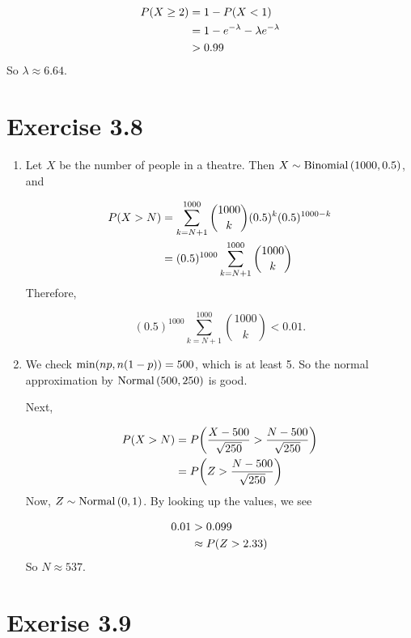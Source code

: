 \documentclass[12pt,letterpaper,reqno]{amsart}
\numberwithin{equation}{subsection}
\begin{document}
\begin{align*}
    {P}\! \left( {X \geq 2} \right) &= 1 - {P}\! \left( {X < 1} \right) \\
                      &= 1 - e^{-\lambda} - \lambda e^{-\lambda} \\
                      &> 0.99
\end{align*}
So $\lambda \approx 6.64$.

\newpage
\section{Exercise 3.8}

\begin{enumerate}[label=(\alph*),leftmargin=*]
    \item Let $X$ be the number of people in a theatre. Then $X \sim \operatorname{Binomial}\left( {1000, 0.5}\right)$, and
    
    \begin{align*}
        {P}\! \left( {X > N} \right) &= \sum_{k=N+1}^{1000} \binom{1000}{k} (0.5)^k (0.5)^{1000-k} \\
        &= (0.5)^{1000} \sum_{k=N+1}^{1000} \binom{1000}{k}
    \end{align*}
    Therefore,
    
    \[ (0.5)^{1000} \sum_{k=N+1}^{1000} \binom{1000}{k} < 0.01. \]
    
    \item We check ${\min}\! \left( {np, n(1-p)} \right) = 500$, which is at least 5. So the normal approximation by $\operatorname{Normal}\left( {500, 250} \right)$ is good.
    
    Next,
    
    \begin{align*}
        {P}\! \left( {X > N} \right) &= {P}\! \left( {\frac{X-500}{\sqrt{250}} > \frac{N-500}{\sqrt{250}}} \right) \\
        &= {P}\! \left( {Z > \frac{N-500}{\sqrt{250}}} \right)
    \end{align*}
    Now, $Z \sim \operatorname{Normal}\left( {0, 1} \right)$. By looking up the values, we see
    
    \begin{align*}
        0.01 &> 0.099 \\
             &\approx {P}\! \left( {Z > 2.33} \right)
    \end{align*}
    So $N \approx 537$.
\end{enumerate}

\newpage
\section{Exerise 3.9}
\end{document}
